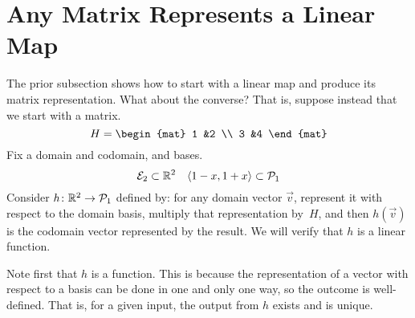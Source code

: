 \documentclass[10pt,t]{beamer}
\begin{document}
\section{Any Matrix Represents a Linear Map}
\begin{frame}
\ex
The prior subsection shows how to start with a linear map and produce its matrix
representation.
What about the converse?
That is, 
suppose instead that we start with a matrix.
\begin{equation*}
  H=\begin{mat}
    1 &2 \\
    3 &4
  \end{mat}
\end{equation*}
Fix a domain and codomain, and bases.
\begin{equation*}
  {\cal E}_2\subset\mathbb{R}^2
  \quad
  \langle1-x,1+x\rangle\subset\mathcal{P}_1
\end{equation*}
\pause
Consider $\mbox{$h\colon \mathbb{R}^2\to \mathcal{P}_1$}$ defined by:
for any domain vector $\vec{v}$, represent it with respect to the domain basis,
multiply that representation by~$H$, 
and then $h(\vec{v})$ is the codomain vector represented by
the result.
We will verify that $h$ is a linear function.

\pause
Note first that $h$ is a function.
This is because
the representation of a vector with respect to a basis can be done in
one and only one way, so the outcome is well-defined.
That is, for a given input, the output from $h$ exists and is unique. 
\end{frame}
\end{document}
